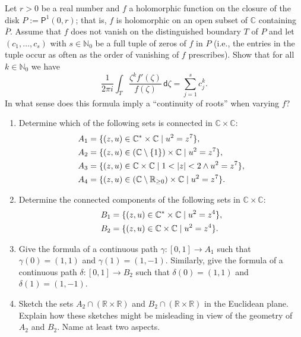 \documentclass[a4paper]{amsart}
\newcommand{\N}{\mathbb{N}}
\newcommand{\C}{\mathbb{C}}
\newcommand{\R}{\mathbb{R}}
\newcommand{\Polydisk}[3]{\mathsf{P}^{#1}(#2,#3)}
\theoremstyle{remark}
\numberwithin{equation}{question}
\DeclarePairedDelimiter\abs{\lvert}{\rvert}
\DeclarePairedDelimiter\set{\{}{\}}
\begin{document}
\begin{question}[subtitle={Calculating power sums of zeros}]
\label{qu:power sums}
Let $r > 0$ be a real number and $f$ a holomorphic function on the closure of the disk $P := \Polydisk10r$; that is, $f$ is holomorphic on an open subset of $\C$ containing $\overline P$. Assume that $f$ does not vanish on the distinguished boundary $T$ of $P$ and let $(c_1,\dots,c_s)$ with $s \in \N_0$ be a full tuple of zeros of $f$ in $P$ (i.e., the entries in the tuple occur as often as the order of vanishing of $f$ prescribes). Show that for all $k \in \N_0$ we have
\[
\frac{1}{2\pi i}\int_T \frac{\zeta^kf'(\zeta)}{f(\zeta)} \,\mathsf d\zeta = \sum_{j=1}^s c_j^k .
\]
In what sense does this formula imply a “continuity of roots” when varying $f$?
\end{question}

\begin{question}%
\label{qu:connectedness}
\begin{enumerate}
\item Determine which of the following sets is connected in $\C \times \C$:
\begin{align*}
A_1 &= \set{(z,u) \in \C^* \times \C \mid u^2 = z^7}, \\
A_2 &= \set{(z,u) \in (\C \setminus \set1) \times \C \mid u^2 = z^7}, \\
A_3 &= \set{(z,u) \in \C \times \C \mid 1 < \abs z < 2 \land u^2 = z^7}, \\
A_4 &= \set{(z,u) \in (\C \setminus \R_{\ge0}) \times \C \mid u^2 = z^7}.
\end{align*}
\item\label{it:connectedness-b} Determine the connected components of the following sets in $\C \times \C$:
\begin{align*}
B_1 &= \set{(z,u) \in \C^* \times \C \mid u^2 = z^4}, \\
B_2 &= \set{(z,u) \in \C \times \C \mid u^2 = z^4}.
\end{align*}
\item Give the formula of a continuous path $\gamma \colon [0,1] \to A_1$ such that $\gamma(0) = (1,1)$ and $\gamma(1) = (1,-1)$. Similarly, give the formula of a continuous path $\delta \colon [0,1] \to B_2$ such that $\delta(0) = (1,1)$ and $\delta(1) = (1,-1)$.
\item Sketch the sets $A_2 \cap (\R \times \R)$ and $B_2 \cap (\R \times \R)$ in the Euclidean plane. Explain how these sketches might be misleading in view of the geometry of $A_2$ and $B_2$. Name at least two aspects.
\end{enumerate}
\end{question}
\end{document}
